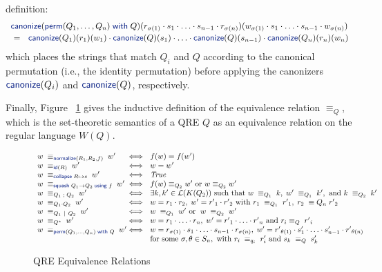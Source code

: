 \documentclass[acmsmall,review,anonymous]{acmart}
\newcommand{\kw}[1]{\textcolor{dkblue}{\ensuremath{\mathsf{#1}}}}
\newcommand{\collapse}[2]{\ensuremath{\kw{collapse} \; #1 \mapsto #2}}
\newcommand{\squash}[3]{\ensuremath{\kw{squash} \; #1 \rightarrow #2\; \kw{using} \; #3}}
\newcommand{\perm}[2]{\ensuremath{\kw{perm}(#1)\; \kw{with}\; #2}}
\newcommand{\normalize}[3]{\ensuremath{\kw{normalize}(#1, #2, #3)}}
\newcommand{\eqrel}[1]{\ensuremath{\equiv_{#1}}}
\newcommand{\sep}{\ensuremath{\ | \ }}
\newcommand{\canonize}{\ensuremath{\kw{canonize}}}
\newcommand{\id}{\ensuremath{\kw{id}}}
\begin{document}
definition:
\[
\begin{array}{l}
\canonize(\perm{Q_1, \ldots, Q_n}{Q})(r_{\sigma(1)}
\cdot s_1 \cdot \ldots \cdot s_{n-1} \cdot r_{\sigma(n)})(w_{\sigma(1)} \cdot s_1
  \cdot \ldots \cdot s_{n-1} \cdot w_{\sigma(n)})\\[.5ex]
\ =\ \ \canonize(Q_1)(r_1)(w_1) \cdot \canonize(Q)(s_1) \cdot \ldots \cdot
\canonize(Q)(s_{n-1})\cdot\canonize(Q_n)(r_n)(w_n)
\end{array}
\]
\noindent 
which places the strings that match $Q_i$ and $Q$ according to the
canonical permutation (i.e., the identity permutation) before applying
the canonizers $\canonize(Q_i)$ and $\canonize(Q)$, respectively.

Finally, Figure ~\ref{fig:relations} gives the inductive definition of the
equivalence relation $\eqrel{Q}$, which is the set-theoretic semantics
of a QRE $Q$ as an equivalence relation on the regular language $W(Q)$.

\begin{figure}[t]
\centering
\[
\begin{array}{l@{}l@{\ \ }l}
w \; \equiv_{\normalize{R_1}{R_2}{f}} \; w' &\iff&
f(w)=f(w') \\
w \; \equiv_{\id(R)} \; w' &\iff& w = w' \\
w \; \equiv_{\collapse{R}{s}} \; w' &\iff& \mathit{True} \\ %
w \; \equiv_{\squash{Q_1}{Q_2}{f}} \; w' &\iff& f(w) \equiv_{Q_2} w'
\text{ or } w \equiv_{Q_2} w' \\
w \; \equiv_{Q_1 \; ; \; Q_2} \; w' &\iff& \exists k, k' \in
\mathcal{L}(K(Q_2)) \text{ such that } w \; \equiv_{Q_1} \; k, \; w' \;
\equiv_{Q_1} \; k', \text{ and } k \; \equiv_{Q_2} \; k'\\
w \; \equiv_{Q_1 \cdot Q_2} \; w'  &\iff& w = r_1
\cdot r_2, \; w' = {r'}_1 \cdot {r'}_2 \text{ with } r_1 \; \equiv_{Q_1}
\; {r'}_1, \; r_2 \; \equiv{Q_n} \; {r'}_2\\
w \; \equiv_{Q_1 \sep Q_2} \; w' &\iff& w \; \equiv_{Q_1} \; w'
\text{ or } \; w \; \equiv_{Q_2} \; w'\\
w \; \equiv_{Q^*} \; w' &\iff& w = r_1 \cdot \ldots \cdot r_n, \; w'
= {r'}_1 \cdot \ldots \cdot {r'}_n \text{ and } r_i \equiv_{Q} \; {r'}_i
\\
w \; \equiv_{\perm{Q_1, \ldots, Q_n}{Q}} \; w' &\iff& w = r_{\sigma(1)}
\cdot s_1 \cdot \ldots \cdot s_{n-1} \cdot r_{\sigma(n)}, \;
w' = {r'}_{\theta(1)} \cdot s'_1 \cdot \ldots \cdot s'_{n-1}
\cdot {r'}_{\theta(n)} \\
& & \text{for some } \sigma, \theta \in S_n, \text{ with } r_i \;
\equiv_{q_i} \; r'_i \text{ and } s_k \; \equiv_{Q} \; s'_{k}
\end{array}
\]
\caption{QRE Equivalence Relations}
\label{fig:relations}
\end{figure}
\end{document}
